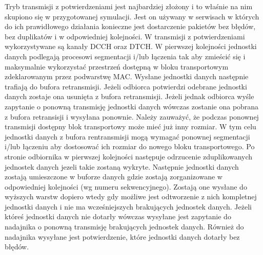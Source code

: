 Tryb transmisji z potwierdzeniami jest najbardziej złożony i to właśnie na nim skupiono się w przygotowanej symulacji. Jest on używany w serwisach w których do ich prawidłowego działania konieczne jest dostarczenie pakietów bez błędów, bez duplikatów i w odpowiedniej kolejności. W transmisji z potwierdzeniami wykorzystywane są kanały DCCH oraz DTCH. W pierwszej kolejności jednostki danych podlegają procesowi segmentacji i/lub łączenia tak aby zmieścić się i maksymalnie wykorzystać przestrzeń dostępną w bloku transportowym zdeklarowanym przez podwarstwę MAC. Wysłane jednostki danych następnie trafiają do bufora retransmisji. Jeżeli odbiorca potwierdzi odebrane jednostki danych zostaje ona usunięta z bufora retransmisji. Jeżeli jednak odbiorca wyśle zapytanie o ponowną transmisję jednostki danych wówczas zostanie ona pobrana z bufora retransisji i wysyłana ponownie. Należy zauważyć, że podczas ponownej transmisji dostępny blok transportowy może mieć już inny rozmiar. W tym celu jednostki danych z bufora rentransmisji mogą wymagać ponownej segmentacji i/lub łączeniu aby dostosować ich rozmiar do nowego bloku transportowego.
Po stronie odbiornika w pierwszej kolejności następuje odrzucenie zduplikowanych jednostek danych jezeli takie zostaną wykryte. Następnie jednostki danych zostają umieszczone w buforze danych gdzie zostają zorganizowane w odpowiedniej kolejności (wg numeru sekwencyjnego). Zostają one wysłane do wyższych warstw dopiero wtedy gdy możliwe jest odtworzenie z nich kompletnej jednostki danych i nie ma wcześniejszych brakujących jednostek danych. Jeżeli któreś jednostki danych nie dotarły wówczas wysyłane jest zapytanie do nadajnika o ponowną transmisję brakujących jednostek danych. Również do nadajnika wysyłane jest potwierdzenie, które jednostki danych dotarły bez błędów.